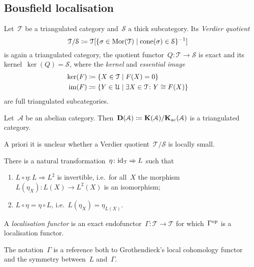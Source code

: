\documentclass[10pt,a4paper]{article}
\begin{document}
\subsection{Bousfield localisation}
Let~$\mathcal{T}$ be a triangulated category and~$\mathcal{S}$ a thick subcategory. Its \emph{Verdier quotient}
\begin{equation}
  \mathcal{T}/\mathcal{S}\coloneqq\mathcal{T}[\{\sigma\in\operatorname{Mor}(\mathcal{T})\mid\operatorname{cone}(\sigma)\in\mathcal{S}\}^{-1}]
\end{equation}
is again a triangulated category, the quotient functor~$Q\colon\mathcal{T}\to\mathcal{S}$ is exact and its kernel~$\ker(Q)=\mathcal{S}$, where the \emph{kernel} and \emph{essential image}
\begin{equation}
  \begin{aligned}
    \ker(F)&\coloneqq\{X\in\mathcal{T}\mid F(X)=0\} \\
    \operatorname{im}(F)&\coloneqq\{Y\in\mathcal{U}\mid \exists X\in\mathcal{T}\colon Y\cong F(X)\}
  \end{aligned}
\end{equation}
are full triangulated subcategories.
\begin{example}
  Let~$\mathcal{A}$ be an abelian category. Then~$\mathbf{D}(\mathcal{A})\coloneqq\mathbf{K}(\mathcal{A})/\mathbf{K}_{\mathrm{ac}}(\mathcal{A})$ is a triangulated category.
\end{example}
\begin{remark}
  A priori it is unclear whether a Verdier quotient~$\mathcal{T}/\mathcal{S}$ is locally small.
\end{remark}
\begin{definition}
   There is a natural transformation~$\eta\colon\mathrm{id}_{\mathcal{T}}\Rightarrow L$ such that
  \begin{enumerate}
    \item $L\circ\eta\colon L\Rightarrow L^2$ is invertible, i.e.\ for all~$X$ the morphism~$L(\eta_X)\colon L(X)\to L^2(X)$ is an isomorphism;
    \item $L\circ\eta=\eta\circ L$, i.e.\ $L(\eta_X)=\eta_{L(X)}$.
  \end{enumerate}
\end{definition}
\begin{definition}
  A \emph{localisation functor} is an exact endofunctor~$\Gamma\colon\mathcal{T}\to\mathcal{T}$ for which~$\Gamma^{\mathrm{op}}$ is a localisation functor.
\end{definition}
\begin{remark}
  The notation~$\Gamma$ is a reference both to Grothendieck's local cohomology functor and the symmetry between~$L$ and~$\Gamma$.
\end{remark}
\end{document}
